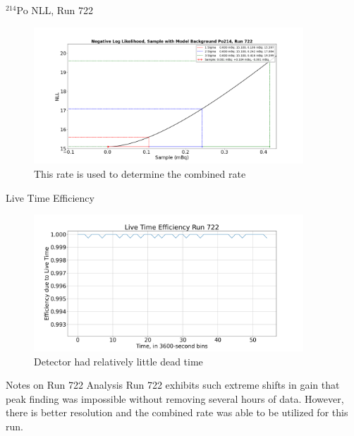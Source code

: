 \documentclass[aspectratio=169]{beamer}
\begin{document}
\begin{frame}{$^{214}$Po NLL, Run 722}
    \begin{figure}
        \begin{center}
            \includegraphics[width=0.9\textwidth]
            {assets/722/NLL214.png}
            \caption{This rate is used to determine the combined rate}
        \end{center}
    \end{figure}
\end{frame}

\begin{frame}{Live Time Efficiency}
    \begin{figure}
        \begin{center}
            \includegraphics[width=0.9\textwidth]
            {assets/722/LTE.png}
            \caption{Detector had relatively little dead time}
        \end{center}
    \end{figure}
\end{frame}

\begin{frame}{Notes on Run 722 Analysis}
    Run 722 exhibits such extreme shifts in gain that peak finding was impossible without removing 
    several hours of data.
    However, there is better resolution and the combined rate was able to be utilized for this run.


    \hyperlink{RvT_722}{}
\end{frame}
\end{document}
